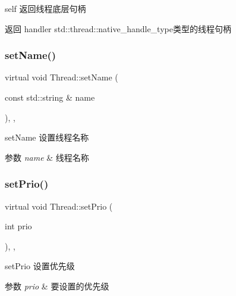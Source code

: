 self 返回线程底层句柄 

\begin{DoxyReturn}{返回}
handler std\+::thread\+::native\+\_\+handle\+\_\+type类型的线程句柄 
\end{DoxyReturn}
\mbox{\label{classThread_ae816904b2a3e248472813e17c2b12a71}} 
\subsubsection{\texorpdfstring{set\+Name()}{setName()}}
{\footnotesize\ttfamily virtual void Thread\+::set\+Name (\begin{DoxyParamCaption}\item[{const std\+::string \&}]{name }\end{DoxyParamCaption})\hspace{0.3cm}{\ttfamily [inline]}, {\ttfamily [final]}, {\ttfamily [virtual]}}



set\+Name 设置线程名称 


\begin{DoxyParams}{参数}
{\em name} & 线程名称 \\
\hline
\end{DoxyParams}
\mbox{\label{classThread_a96661f80f5fbd26042a24eafd675cd91}} 
\subsubsection{\texorpdfstring{set\+Prio()}{setPrio()}}
{\footnotesize\ttfamily virtual void Thread\+::set\+Prio (\begin{DoxyParamCaption}\item[{int}]{prio }\end{DoxyParamCaption})\hspace{0.3cm}{\ttfamily [inline]}, {\ttfamily [final]}, {\ttfamily [virtual]}}



set\+Prio 设置优先级 


\begin{DoxyParams}{参数}
{\em prio} & 要设置的优先级 \\
\hline
\end{DoxyParams}
\mbox{\label{classThread_a231da16ab1825ee982c4aa43f78c1b22}} 
